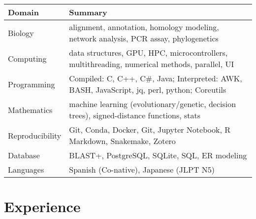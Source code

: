 \documentclass[11pt,a4paper,]{awesome-cv}
\begin{document}
\begin{tabular}{l|l}
\hline
\textbf{Domain} & \textbf{Summary}\\
\hline
Biology & alignment, annotation, homology modeling, network analysis, PCR assay, phylogenetics\\
\hline
Computing & data structures, GPU, HPC, microcontrollers, multithreading, numerical methods, parallel, UI\\
\hline
Programming & Compiled: C, C++, C\#, Java; Interpreted: AWK, BASH, JavaScript, jq, perl, python; Coreutils\\
\hline
Mathematics & machine learning (evolutionary/genetic, decision trees), signed-distance functions, stats\\
\hline
Reproducibility & Git, Conda, Docker, Git, Jupyter Notebook, R Markdown, Snakemake, Zotero\\
\hline
Database & BLAST+, PostgreSQL, SQLite, SQL, ER modeling\\
\hline
Languages & Spanish (Co-native), Japanese (JLPT N5)\\
\hline
\end{tabular}

\hypertarget{experience}{%
\section{Experience}\label{experience}}
\end{document}
